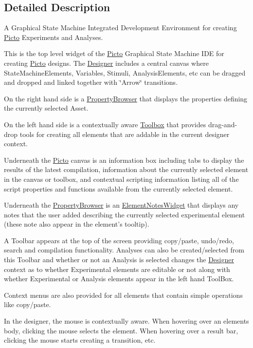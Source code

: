 \subsection{Detailed Description}
A Graphical State Machine Integrated Development Environment for creating \hyperlink{namespace_picto}{Picto} Experiments and Analyses. 

This is the top level widget of the \hyperlink{namespace_picto}{Picto} Graphical State Machine I\-D\-E for creating \hyperlink{namespace_picto}{Picto} designs. The \hyperlink{class_designer}{Designer} includes a central canvas where State\-Machine\-Elements, Variables, Stimuli, Analysis\-Elements, etc can be dragged and dropped and linked together with \char`\"{}\-Arrow\char`\"{} transitions.

On the right hand side is a \hyperlink{class_property_browser}{Property\-Browser} that displays the properties defining the currently selected Asset.

On the left hand side is a contextually aware \hyperlink{class_toolbox}{Toolbox} that provides drag-\/and-\/drop tools for creating all elements that are addable in the current designer context.

Underneath the \hyperlink{namespace_picto}{Picto} canvas is an information box including tabs to display the results of the latest compilation, information about the currently selected element in the canvas or toolbox, and contextual scripting information listing all of the script properties and functions available from the currently selected element.

Underneath the \hyperlink{class_property_browser}{Property\-Browser} is an \hyperlink{class_element_notes_widget}{Element\-Notes\-Widget} that displays any notes that the user added describing the currently selected experimental element (these note also appear in the element's tooltip).

A Toolbar appears at the top of the screen providing copy/paste, undo/redo, search and compilation functionality. Analyses can also be created/selected from this Toolbar and whether or not an Analysis is selected changes the \hyperlink{class_designer}{Designer} context as to whether Experimental elements are editable or not along with whether Experimental or Analysis elements appear in the left hand Tool\-Box.

Context menus are also provided for all elements that contain simple operations like copy/paste.

In the designer, the mouse is contextually aware. When hovering over an elements body, clicking the mouse selects the element. When hovering over a result bar, clicking the mouse starts creating a transition, etc.

